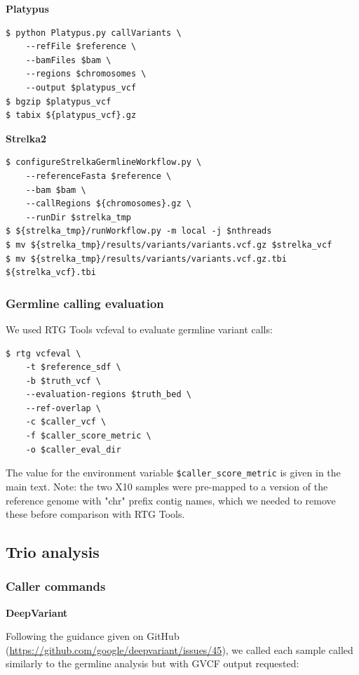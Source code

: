 \documentclass{article}
\begin{document}
\noindent \textbf{Platypus}

\begin{lstlisting}
$ python Platypus.py callVariants \
    --refFile $reference \
    --bamFiles $bam \
    --regions $chromosomes \
    --output $platypus_vcf
$ bgzip $platypus_vcf
$ tabix ${platypus_vcf}.gz
\end{lstlisting}

\noindent \textbf{Strelka2}

\begin{lstlisting}
$ configureStrelkaGermlineWorkflow.py \
    --referenceFasta $reference \
    --bam $bam \
    --callRegions ${chromosomes}.gz \
    --runDir $strelka_tmp
$ ${strelka_tmp}/runWorkflow.py -m local -j $nthreads
$ mv ${strelka_tmp}/results/variants/variants.vcf.gz $strelka_vcf
$ mv ${strelka_tmp}/results/variants/variants.vcf.gz.tbi ${strelka_vcf}.tbi
\end{lstlisting}

\subsubsection*{Germline calling evaluation}

\noindent We used RTG Tools vcfeval to evaluate germline variant calls:

\begin{lstlisting}
$ rtg vcfeval \
    -t $reference_sdf \
    -b $truth_vcf \
    --evaluation-regions $truth_bed \
    --ref-overlap \
    -c $caller_vcf \
    -f $caller_score_metric \
    -o $caller_eval_dir
\end{lstlisting}

\noindent The value for the environment variable \lstinline!$caller_score_metric! is given in the main text. Note: the two X10 samples were pre-mapped to a version of the reference genome with "chr" prefix contig names, which we needed to remove these before comparison with RTG Tools.

\subsection*{Trio analysis}

\subsubsection*{Caller commands}

\noindent \textbf{DeepVariant}

Following the guidance given on GitHub (\url{https://github.com/google/deepvariant/issues/45}), we called each sample called similarly to the germline analysis but with GVCF output requested:
\end{document}
